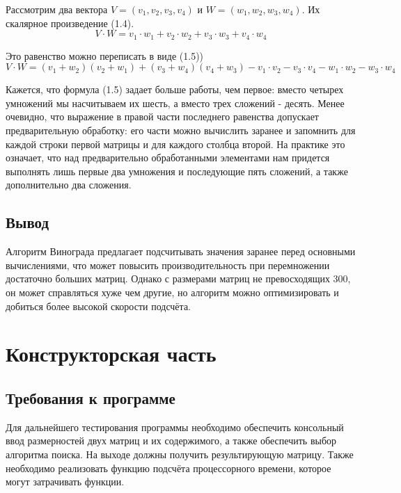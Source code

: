 \documentclass[12pt,a4paper]{report}
\begin{document}
Рассмотрим два вектора $V = (v_{1}, v_{2}, v_{3}, v_{4})$ и $W = (w_{1}, w_{2}, w_{3}, w_{4})$. Их 
скалярное произведение (1.4). 
\begin{equation}
    V \cdot W = v_{1} \cdot w_{1} + v_{2} \cdot w_{2} + v_{3} \cdot w_{3} + v_{4} \cdot w_{4}
    \label{formula:1}
\end{equation}

Это равенство можно переписать в виде (1.5))
\begin{equation}
    V \cdot W = (v_{1} + w_{2})(v_{2} + w_{1}) + (v_{3} + w_{4})(v_{4} + w_{3}) - v_{1} \cdot v_{2} - v_{3} \cdot v_{4} - w_{1} \cdot w_{2} - w_{3} \cdot w_{4}
    \label{formula:2}    
\end{equation}

Кажется, что формула (1.5) задает больше работы, чем первое: вместо четырех умножений мы насчитываем их 
шесть, а вместо трех сложений - десять.
Менее очевидно, что выражение в правой части последнего равенства допускает предварительную обработку: его 
части можно вычислить заранее и запомнить для каждой строки первой матрицы и для каждого столбца второй. 
На практике это означает, что над предварительно обработанными элементами нам придется выполнять лишь первые 
два умножения и последующие пять сложений, а также дополнительно два сложения.

\section{Вывод}

Алгоритм Винограда предлагает подсчитывать значения заранее перед основными вычислениями, что может повысить 
производительность при перемножении достаточно больших матриц. 
Однако с размерами матриц не превосходящих 300, он может справляться хуже чем другие, но алгоритм можно оптимизировать и добиться 
более высокой скорости подсчёта.

\newpage
\chapter{Конструкторская часть}

\section{Требования к программе}

Для дальнейшего тестирования программы необходимо обеспечить консольный ввод размерностей двух матриц 
и их содержимого, а также обеспечить выбор алгоритма поиска. На выходе должны получить результирующую 
матрицу. Также необходимо реализовать функцию подсчёта процессорного времени, которое могут затрачивать функции.
\end{document}
